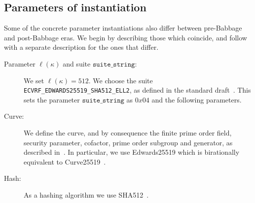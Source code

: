 \subsection{Parameters of instantiation}
Some of the concrete parameter instantiations also differ between pre-Babbage and post-Babbage eras. We begin by
describing those which coincide, and follow with a separate description for the ones that differ.
\begin{description}
    \item[Parameter $\ell(\kappa)$ and suite $\texttt{suite\_string}$:] We set $\ell(\kappa)=512$. We choose the
    suite \texttt{ECVRF\_EDWARDS25519\_SHA512\_ELL2}, as defined in the standard draft~\cite{vrfdraft10}. This
    sets the parameter $\texttt{suite\_string}$ as $0x04$ and the following parameters.
    \item[Curve:] We define the curve, and by consequence the finite prime order field, security parameter, cofactor,
    prime order subgroup and generator, as described in~\cite{CHES:BDLSY11}. In particular, we use Edwards25519
    which is birationally equivalent to Curve25519~\cite{PKC:Bernstein06}.
    \item[Hash:] As a hashing algorithm we use SHA512~\cite{FIPS1802}.
\end{description}

